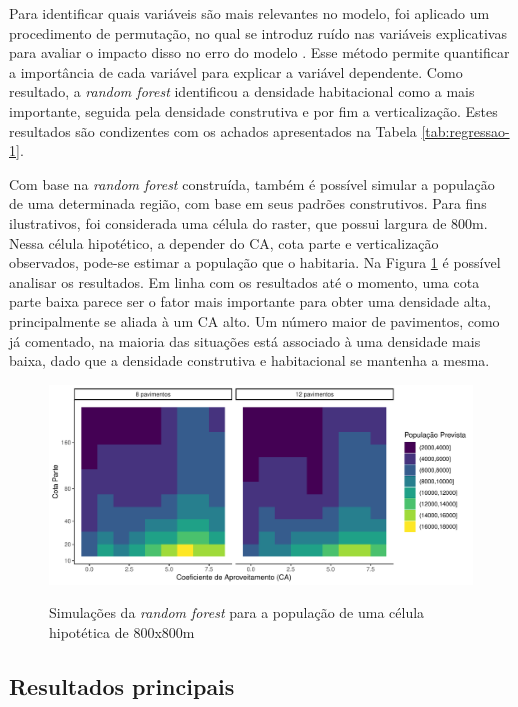 Para identificar quais variáveis são mais relevantes no modelo, foi aplicado um procedimento de permutação, no qual se introduz ruído nas variáveis explicativas para avaliar o impacto disso no erro do modelo \cite{breiman2001random, Nembrini2018}. Esse método permite quantificar a importância de cada variável para explicar a variável dependente. Como resultado, a \textit{random forest} identificou a densidade habitacional como a mais importante, seguida pela densidade construtiva e por fim a verticalização. Estes resultados são condizentes com os achados apresentados na Tabela \ref{tab:regressao-1}.

Com base na \textit{random forest} construída, também é possível simular a população de uma determinada região, com base em seus padrões construtivos. Para fins ilustrativos, foi considerada uma célula do raster, que possui largura de 800m. Nessa célula hipotético, a depender do CA, cota parte e verticalização observados, pode-se estimar a população que o habitaria. Na Figura \ref{fig:previsoes} é possível analisar os resultados. Em linha com os resultados até o momento, uma cota parte baixa parece ser o fator mais importante para obter uma densidade alta, principalmente se aliada à um CA alto. Um número maior de pavimentos, como já comentado, na maioria das situações está associado à uma densidade mais baixa, dado que a densidade construtiva e habitacional se mantenha a mesma.

\begin{figure}[h]
    \centering
    \caption{Simulações da \textit{random forest} para a população de uma célula hipotética de 800x800m}
    \includegraphics[width = \textwidth]{figuras/previsoes.pdf}
    \label{fig:previsoes}
\end{figure}

\subsection{Resultados principais}


